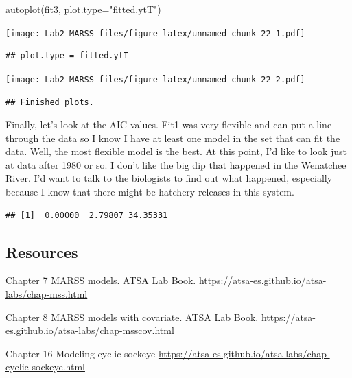\documentclass[
]{article}
\newenvironment{Shaded}{\begin{snugshade}}{\end{snugshade}}
\newcommand{\AttributeTok}[1]{\textcolor[rgb]{0.77,0.63,0.00}{#1}}
\newcommand{\FunctionTok}[1]{\textcolor[rgb]{0.00,0.00,0.00}{#1}}
\newcommand{\NormalTok}[1]{#1}
\newcommand{\OtherTok}[1]{\textcolor[rgb]{0.56,0.35,0.01}{#1}}
\newcommand{\SpecialCharTok}[1]{\textcolor[rgb]{0.00,0.00,0.00}{#1}}
\newcommand{\StringTok}[1]{\textcolor[rgb]{0.31,0.60,0.02}{#1}}
\begin{document}
\begin{Shaded}
\begin{Highlighting}[]
\FunctionTok{autoplot}\NormalTok{(fit3, }\AttributeTok{plot.type=}\StringTok{"fitted.ytT"}\NormalTok{)}
\end{Highlighting}
\end{Shaded}

\texttt{[image: Lab2-MARSS\_files/figure-latex/unnamed-chunk-22-1.pdf]}

\begin{verbatim}
## plot.type = fitted.ytT
\end{verbatim}

\texttt{[image: Lab2-MARSS\_files/figure-latex/unnamed-chunk-22-2.pdf]}

\begin{verbatim}
## Finished plots.
\end{verbatim}

Finally, let's look at the AIC values. Fit1 was very flexible and can
put a line through the data so I know I have at least one model in the
set that can fit the data. Well, the most flexible model is the best. At
this point, I'd like to look just at data after 1980 or so. I don't like
the big dip that happened in the Wenatchee River. I'd want to talk to
the biologists to find out what happened, especially because I know that
there might be hatchery releases in this system.

\begin{Shaded}
\end{Shaded}

\begin{verbatim}
## [1]  0.00000  2.79807 34.35331
\end{verbatim}

\hypertarget{resources}{%
\subsection{Resources}\label{resources}}

Chapter 7 MARSS models. ATSA Lab Book.
\url{https://atsa-es.github.io/atsa-labs/chap-mss.html}

Chapter 8 MARSS models with covariate. ATSA Lab Book.
\url{https://atsa-es.github.io/atsa-labs/chap-msscov.html}

Chapter 16 Modeling cyclic sockeye
\url{https://atsa-es.github.io/atsa-labs/chap-cyclic-sockeye.html}
\end{document}
